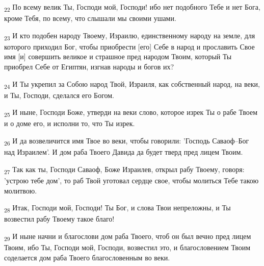 \begin{tcolorbox}
\textsubscript{22} По всему велик Ты, Господи мой, Господи! ибо нет подобного Тебе и нет Бога, кроме Тебя, по всему, что слышали мы своими ушами.
\end{tcolorbox}
\begin{tcolorbox}
\textsubscript{23} И кто подобен народу Твоему, Израилю, единственному народу на земле, для которого приходил Бог, чтобы приобрести [его] Себе в народ и прославить Свое имя [и] совершить великое и страшное пред народом Твоим, который Ты приобрел Себе от Египтян, изгнав народы и богов их?
\end{tcolorbox}
\begin{tcolorbox}
\textsubscript{24} И Ты укрепил за Собою народ Твой, Израиля, как собственный народ, на веки, и Ты, Господи, сделался его Богом.
\end{tcolorbox}
\begin{tcolorbox}
\textsubscript{25} И ныне, Господи Боже, утверди на веки слово, которое изрек Ты о рабе Твоем и о доме его, и исполни то, что Ты изрек.
\end{tcolorbox}
\begin{tcolorbox}
\textsubscript{26} И да возвеличится имя Твое во веки, чтобы говорили: 'Господь Саваоф--Бог над Израилем'. И дом раба Твоего Давида да будет тверд пред лицем Твоим.
\end{tcolorbox}
\begin{tcolorbox}
\textsubscript{27} Так как ты, Господи Саваоф, Боже Израилев, открыл рабу Твоему, говоря: 'устрою тебе дом', то раб Твой уготовал сердце свое, чтобы молиться Тебе такою молитвою.
\end{tcolorbox}
\begin{tcolorbox}
\textsubscript{28} Итак, Господи мой, Господи! Ты Бог, и слова Твои непреложны, и Ты возвестил рабу Твоему такое благо!
\end{tcolorbox}
\begin{tcolorbox}
\textsubscript{29} И ныне начни и благослови дом раба Твоего, чтоб он был вечно пред лицем Твоим, ибо Ты, Господи мой, Господи, возвестил это, и благословением Твоим соделается дом раба Твоего благословенным во веки.
\end{tcolorbox}
